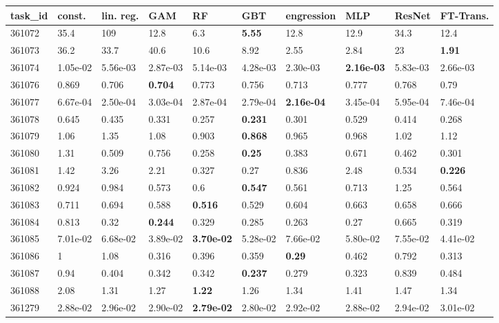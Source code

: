 \begin{table}[ht!]
\centering
\begingroup\footnotesize
\begin{tabular}{llllllllll}
  \hline
\hline
task\_id & const. & lin. reg. & GAM & RF & GBT & engression & MLP & ResNet & FT-Trans. \\ 
  \hline
361072 & 35.4 & 109 & 12.8 & 6.3 & \textbf{5.55} & 12.8 & 12.9 & 34.3 & 12.4 \\ 
  361073 & 36.2 & 33.7 & 40.6 & 10.6 & 8.92 & 2.55 & 2.84 & 23 & \textbf{1.91} \\ 
  361074 & 1.05e-02 & 5.56e-03 & 2.87e-03 & 5.14e-03 & 4.28e-03 & 2.30e-03 & \textbf{2.16e-03} & 5.83e-03 & 2.66e-03 \\ 
  361076 & 0.869 & 0.706 & \textbf{0.704} & 0.773 & 0.756 & 0.713 & 0.777 & 0.768 & 0.79 \\ 
  361077 & 6.67e-04 & 2.50e-04 & 3.03e-04 & 2.87e-04 & 2.79e-04 & \textbf{2.16e-04} & 3.45e-04 & 5.95e-04 & 7.46e-04 \\ 
  361078 & 0.645 & 0.435 & 0.331 & 0.257 & \textbf{0.231} & 0.301 & 0.529 & 0.414 & 0.268 \\ 
  361079 & 1.06 & 1.35 & 1.08 & 0.903 & \textbf{0.868} & 0.965 & 0.968 & 1.02 & 1.12 \\ 
  361080 & 1.31 & 0.509 & 0.756 & 0.258 & \textbf{0.25} & 0.383 & 0.671 & 0.462 & 0.301 \\ 
  361081 & 1.42 & 3.26 & 2.21 & 0.327 & 0.27 & 0.836 & 2.48 & 0.534 & \textbf{0.226} \\ 
  361082 & 0.924 & 0.984 & 0.573 & 0.6 & \textbf{0.547} & 0.561 & 0.713 & 1.25 & 0.564 \\ 
  361083 & 0.711 & 0.694 & 0.588 & \textbf{0.516} & 0.529 & 0.604 & 0.663 & 0.658 & 0.666 \\ 
  361084 & 0.813 & 0.32 & \textbf{0.244} & 0.329 & 0.285 & 0.263 & 0.27 & 0.665 & 0.319 \\ 
  361085 & 7.01e-02 & 6.68e-02 & 3.89e-02 & \textbf{3.70e-02} & 5.28e-02 & 7.66e-02 & 5.80e-02 & 7.55e-02 & 4.41e-02 \\ 
  361086 & 1 & 1.08 & 0.316 & 0.396 & 0.359 & \textbf{0.29} & 0.462 & 0.792 & 0.313 \\ 
  361087 & 0.94 & 0.404 & 0.342 & 0.342 & \textbf{0.237} & 0.279 & 0.323 & 0.839 & 0.484 \\ 
  361088 & 2.08 & 1.31 & 1.27 & \textbf{1.22} & 1.26 & 1.34 & 1.41 & 1.47 & 1.34 \\ 
  361279 & 2.88e-02 & 2.96e-02 & 2.90e-02 & \textbf{2.79e-02} & 2.80e-02 & 2.92e-02 & 2.88e-02 & 2.94e-02 & 3.01e-02 \\ 

\end{tabular}
\end{table}
